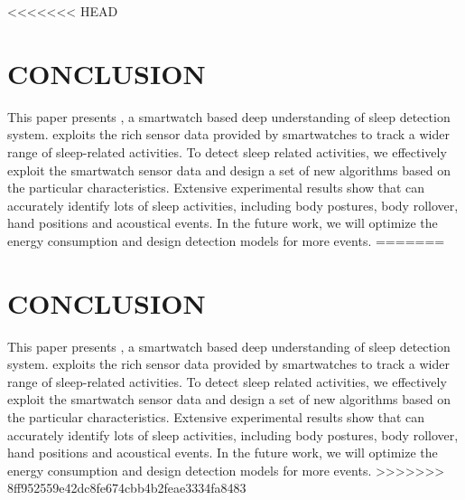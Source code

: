 <<<<<<< HEAD

\section{CONCLUSION}
This paper presents \systemname, a smartwatch based deep understanding of sleep detection system. \systemname exploits the rich sensor data
provided by smartwatches to track a wider range of sleep-related activities. To detect sleep related activities, we effectively exploit the
smartwatch sensor data and design a set of new algorithms based on the particular characteristics. Extensive experimental results show that
\systemname can accurately identify lots of sleep activities, including body postures, body rollover, hand positions and acoustical events.
In the future work, we will optimize the energy consumption and design detection models for more events.
=======

\section{CONCLUSION}
This paper presents \systemname, a smartwatch based deep understanding of sleep detection system. \systemname exploits the rich sensor data
provided by smartwatches to track a wider range of sleep-related activities. To detect sleep related activities, we effectively exploit the
smartwatch sensor data and design a set of new algorithms based on the particular characteristics. Extensive experimental results show that
\systemname can accurately identify lots of sleep activities, including body postures, body rollover, hand positions and acoustical events.
In the future work, we will optimize the energy consumption and design detection models for more events.
>>>>>>> 8ff952559e42dc8fe674cbb4b2feae3334fa8483
